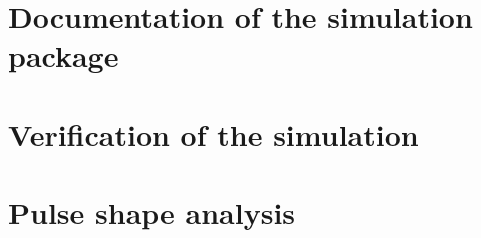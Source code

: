 \documentclass[11pt, a4paper]{article}
\begin{document}
\section{Documentation of the simulation package}
\label{sec:manual}






\section{Verification of the simulation}
\label{sec:verify}


\section{Pulse shape analysis}
\label{sec:physics}


\clearpage
 

\end{document}
